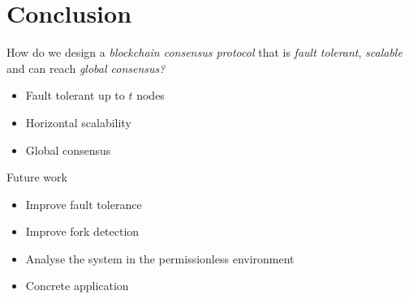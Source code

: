 \documentclass{beamer}
\begin{document}
\section{Conclusion}
\begin{frame}{\secname}
    How do we design a \emph{blockchain consensus protocol} that is \emph{fault tolerant},
    \emph{scalable} and can reach \emph{global consensus?}
\begin{itemize}
  \item[\checkmark] Fault tolerant up to $t$ nodes
  \item[\checkmark] Horizontal scalability
  \item[\checkmark] Global consensus
\end{itemize}
\end{frame}

\begin{frame}{Future work}
\begin{itemize}
\item Improve fault tolerance
\item Improve fork detection
\item Analyse the system in the permissionless environment
\item Concrete application
\end{itemize}
\end{frame}
\end{document}
